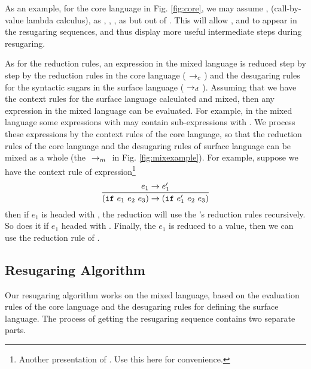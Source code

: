 


As an example, for the core language in Fig.  \ref{fig:core},
we may assume , \m{$\lambda$} (call-by-value lambda calculus),  as , , ,  as  but out of . This will allow , \m{$\lambda$} and  to appear in the resugaring sequences, and thus display more useful intermediate steps during resugaring.

As for the reduction rules, an expression in the mixed language is reduced step by step by the reduction rules in the core language ($~\rightarrow_c~$) and the desugaring rules for the syntactic sugars in the surface language ($~\rightarrow_d~$). Assuming that we have the context rules for the surface language calculated and mixed, then any expression in the mixed language can be evaluated. For example, in the mixed language some expressions with  may contain sub-expressions with . We process these expressions by the context rules of the core language, so that the reduction rules of the core language and the desugaring rules of surface language can be mixed as a whole
 (the $~\rightarrow_m~$ in Fig. \ref{fig:mixexample}). For example, suppose we have the context rule of  expression\footnote{Another presentation of . Use this here for convenience.}
\[
\infer{(\m{if}~e_1~e_2~e_3) \rightarrow (\m{if}~e_1'~e_2~e_3)}{e_1 \rightarrow e_1'}
\]
then if $e_1$ is headed with , the reduction will use the 's reduction rules recursively. So does it if $e_1$ headed with . Finally, the $e_1$ is reduced to a value, then we can use the reduction rule of .


\subsection{Resugaring Algorithm}

Our resugaring algorithm works on the mixed language, based on the evaluation rules of the core language and the desugaring rules for defining the surface language. The process of  getting the resugaring sequence contains two separate parts.

